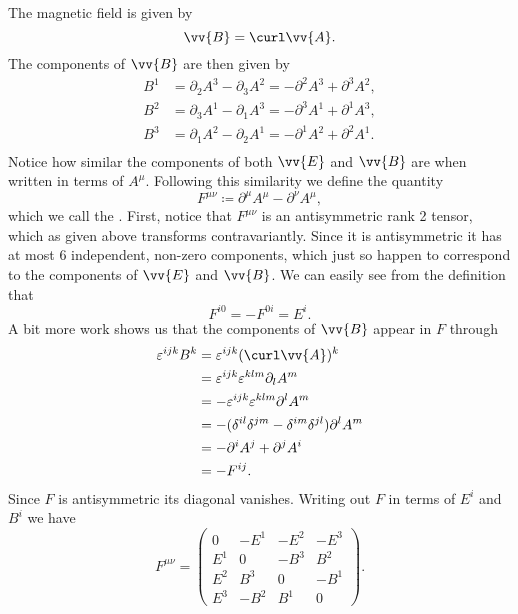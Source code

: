 The magnetic field is given by
\begin{equation}
    \vv{B} = \curl \vv{A}.
\end{equation}
The components of \(\vv{B}\) are then given by
\begin{align}
    B^1 &= \partial_2A^3 - \partial_3A^2 = -\partial^2A^3 + \partial^3A^2,\\
    B^2 &= \partial_3A^1 - \partial_1A^3 = -\partial^3A^1 + \partial^1A^3,\\
    B^3 &= \partial_1A^2 - \partial_2A^1 = -\partial^1A^2 + \partial^2A^1.\\
\end{align}
Notice how similar the components of both \(\vv{E}\) and \(\vv{B}\) are when written in terms of \(A^\mu\).
Following this similarity we define the quantity
\begin{equation}
    F^{\mu\nu} \coloneqq \partial^\mu A^\mu - \partial^\nu A^\mu,
\end{equation}
which we call the .
First, notice that \(F^{\mu\nu}\) is an antisymmetric rank 2 tensor, which as given above transforms contravariantly.
Since it is antisymmetric it has at most 6 independent, non-zero components, which just so happen to correspond to the components of \(\vv{E}\) and \(\vv{B}\).
We can easily see from the definition that
\begin{equation}
    F^{i0} = -F^{0i} = E^i.
\end{equation}
A bit more work shows us that the components of \(\vv{B}\) appear in \(F\) through
\begin{align}
    \varepsilon^{ijk}B^k &= \varepsilon^{ijk}(\curl\vv{A})^k\\
    &= \varepsilon^{ijk}\varepsilon^{klm}\partial_lA^m\\
    &= -\varepsilon^{ijk}\varepsilon^{klm}\partial^lA^m\\
    &= -(\delta^{il}\delta^{jm} - \delta^{im}\delta^{jl})\partial^lA^m\\
    &= -\partial^iA^j + \partial^jA^i\\
    &= -F^{ij}.
\end{align}
Since \(F\) is antisymmetric its diagonal vanishes.
Writing out \(F\) in terms of \(E^i\) and \(B^i\) we have
\begin{equation}
    F^{\mu\nu} = 
    \begin{pmatrix}
        0 & -E^1 & -E^2 & -E^3\\
        E^1 & 0 & -B^3 & B^2\\
        E^2 & B^3 & 0 & -B^1\\
        E^3 & -B^2 & B^1 & 0
    \end{pmatrix}
    .
\end{equation}
